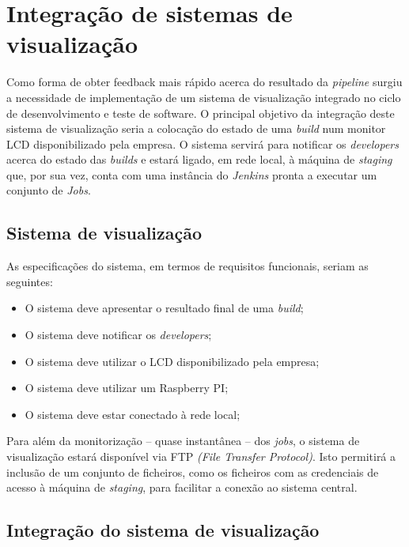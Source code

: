 \section{Integração de sistemas de visualização}
\label{Ch:CapExemplo}

\hspace{1cm}Como forma de obter feedback mais rápido acerca do resultado da \textit{pipeline} surgiu a necessidade de implementação de um sistema de visualização integrado no ciclo de desenvolvimento e teste de software. O principal objetivo da integração deste sistema de visualização seria a colocação do estado de uma \textit{build} num monitor LCD disponibilizado pela empresa. O sistema servirá para notificar os \textit{developers} acerca do estado das \textit{builds} e estará ligado, em rede local, à máquina de  \textit{staging} que, por sua vez, conta com uma instância do \textit{Jenkins} pronta a executar um conjunto de \textit{Jobs}.

\subsection{Sistema de visualização}

As especificações do sistema, em termos de requisitos funcionais, seriam as seguintes: 

\begin{itemize}
  \item O sistema deve apresentar o resultado final de uma \textit{build};
  \item O sistema deve notificar os \textit{developers};
  \item O sistema deve utilizar o LCD disponibilizado pela empresa;
  \item O sistema deve utilizar um Raspberry PI;
  \item O sistema deve estar conectado à rede local;
\end{itemize}

\hspace{1cm}Para além da monitorização -- quase instantânea -- dos \textit{jobs}, o sistema de visualização estará disponível via FTP \textit{(File Transfer Protocol)}. Isto permitirá a inclusão de um conjunto de ficheiros, como os ficheiros com as credenciais de acesso à máquina de \textit{staging}, para facilitar a conexão ao sistema central.

\subsection{Integração do sistema de visualização}

